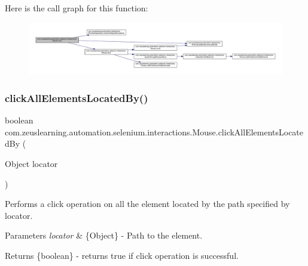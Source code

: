 Here is the call graph for this function\+:
\nopagebreak
\begin{figure}[H]
\begin{center}
\leavevmode
\includegraphics[width=350pt]{d0/dfa/classcom_1_1zeuslearning_1_1automation_1_1selenium_1_1interactions_1_1Mouse_ab765bba8173f469709da14c8c636fe1e_cgraph}
\end{center}
\end{figure}
\hypertarget{classcom_1_1zeuslearning_1_1automation_1_1selenium_1_1interactions_1_1Mouse_af29d27d7e5e67708d7b55c955fd873e9}{}\label{classcom_1_1zeuslearning_1_1automation_1_1selenium_1_1interactions_1_1Mouse_af29d27d7e5e67708d7b55c955fd873e9} 
\subsubsection{\texorpdfstring{click\+All\+Elements\+Located\+By()}{clickAllElementsLocatedBy()}}
{\footnotesize\ttfamily boolean com.\+zeuslearning.\+automation.\+selenium.\+interactions.\+Mouse.\+click\+All\+Elements\+Located\+By (\begin{DoxyParamCaption}\item[{Object}]{locator }\end{DoxyParamCaption})\hspace{0.3cm}{\ttfamily [inline]}}

Performs a click operation on all the element located by the path specified by {\ttfamily locator}.


\begin{DoxyParams}{Parameters}
{\em locator} & \{Object\} -\/ Path to the element.\\
\hline
\end{DoxyParams}
\begin{DoxyReturn}{Returns}
\{boolean\} -\/ returns {\ttfamily true} if click operation is successful. 
\end{DoxyReturn}


